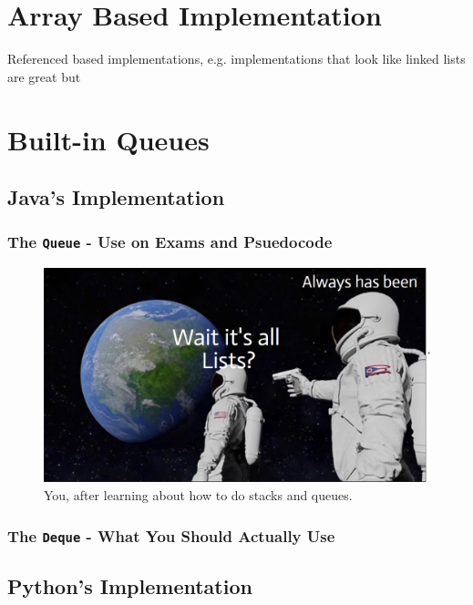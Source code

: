 \section{Array Based Implementation}
Referenced based implementations, e.g. implementations that look like linked lists are great but

\section{Built-in Queues}
\subsection{Java's Implementation}

\subsubsection{The \texttt{Queue} - Use on Exams and Psuedocode}



\begin{figure}
	\centering
	\includegraphics[width=\linewidth]{pics/waitQueuesAreLists}
	\caption{You, after learning about how to do stacks and queues.}
	\label{fig:waitqueuesarelists}
\end{figure}

\subsubsection{The \texttt{Deque} - What You Should Actually Use}

\subsection{Python's Implementation}


